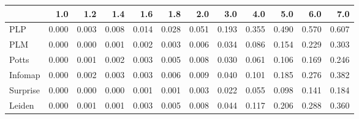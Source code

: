 \begin{tabular}{lrrrrrrrrrrr}
\toprule
{} &   1.0 &   1.2 &   1.4 &   1.6 &   1.8 &   2.0 &   3.0 &   4.0 &   5.0 &   6.0 &   7.0 \\
\midrule
PLP      & 0.000 & 0.003 & 0.008 & 0.014 & 0.028 & 0.051 & 0.193 & 0.355 & 0.490 & 0.570 & 0.607 \\
PLM      & 0.000 & 0.000 & 0.001 & 0.002 & 0.003 & 0.006 & 0.034 & 0.086 & 0.154 & 0.229 & 0.303 \\
Potts    & 0.000 & 0.001 & 0.002 & 0.003 & 0.005 & 0.008 & 0.030 & 0.061 & 0.106 & 0.169 & 0.246 \\
Infomap  & 0.000 & 0.002 & 0.003 & 0.003 & 0.006 & 0.009 & 0.040 & 0.101 & 0.185 & 0.276 & 0.382 \\
Surprise & 0.000 & 0.000 & 0.000 & 0.001 & 0.001 & 0.003 & 0.022 & 0.055 & 0.098 & 0.141 & 0.184 \\
Leiden   & 0.000 & 0.001 & 0.001 & 0.003 & 0.005 & 0.008 & 0.044 & 0.117 & 0.206 & 0.288 & 0.360 \\
\bottomrule
\end{tabular}
